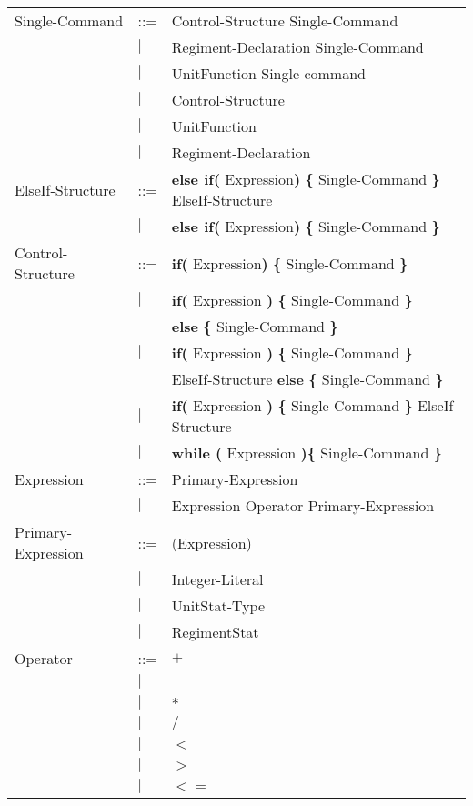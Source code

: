 \begin{center}
\begin{longtable}{l l l}
Single-Command				&	::=	&Control-Structure Single-Command \\
							&$\mid$	&Regiment-Declaration Single-Command\\
							&$\mid$	&UnitFunction Single-command\\
							&$\mid$	&Control-Structure\\
							&$\mid$	&UnitFunction\\
							&$\mid$	&Regiment-Declaration\\
ElseIf-Structure			&	::=	&{\bf else if( } Expression{\bf )} {\bf \{ } Single-Command {\bf \} } ElseIf-Structure\\
							&$\mid$	&{\bf else if( } Expression{\bf )} {\bf \{ } Single-Command {\bf \} } \\
Control-Structure			&	::=	&{\bf if( } Expression{\bf )} {\bf \{ } Single-Command {\bf \} }  \\
							&$\mid$	&{\bf if(} Expression {\bf )} {\bf \{ }Single-Command {\bf \}} \\
							&		&{\bf else } {\bf \{ }Single-Command {\bf \} } \\			
							&$\mid$	&{\bf if(} Expression {\bf )} {\bf \{ }Single-Command {\bf \}} \\
							&		&ElseIf-Structure {\bf else } {\bf \{ }Single-Command {\bf \} } \\
							&$\mid$	&{\bf if(} Expression {\bf )} {\bf \{ }Single-Command {\bf \}} ElseIf-Structure \\	
							&$\mid$	&{\bf while (} Expression {\bf )}{\bf \{ } Single-Command {\bf \}} \\
Expression					&	::=	&Primary-Expression \\
							&$\mid$	&Expression Operator Primary-Expression \\
Primary-Expression			&	::=	&(Expression)\\
							&$\mid$	&Integer-Literal \\
							&$\mid$	&UnitStat-Type \\
							&$\mid$	&RegimentStat \\
Operator					&	::=	&$\boldsymbol {+}$\\
							&$\mid$	&$\boldsymbol {-}$\\
							&$\mid$	&$\boldsymbol {*}$\\
							&$\mid$	&$\boldsymbol {/}$\\
							&$\mid$	&$\boldsymbol {<}$\\
							&$\mid$	&$\boldsymbol {>}$\\
							&$\mid$	&$\boldsymbol {<=}$\\

\end{longtable}
\end{center}
